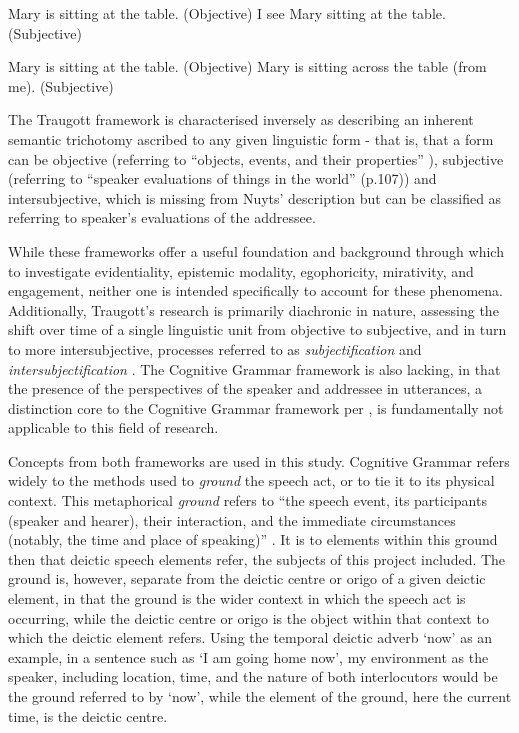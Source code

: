 \begin{exe}
\ex\label{ex:LangackerNuyts1}
\begin{xlist}
\ex Mary is sitting at the table. (Objective)\label{ex:LangackerNuyts1:Obj}
\ex I see Mary sitting at the table. (Subjective)\label{ex:LangackerNuyts1:Subj}
\end{xlist}
\cite[107]{Nuyts2015}
\end{exe}

\begin{exe}
\ex\label{ex:MyLangackerNuyts}
\begin{xlist}
\ex Mary is sitting at the table. (Objective)
\ex Mary is sitting across the table (from me). (Subjective)
\end{xlist}
\end{exe}

The Traugott framework is characterised inversely as describing an inherent semantic trichotomy ascribed to any given linguistic form - that is, that a form can be objective (referring to ``objects, events, and their properties'' \cite[107]{Nuyts2015}), subjective (referring to ``speaker evaluations of things in the world'' (p.107)) and intersubjective, which is missing from Nuyts' description but can be classified as referring to speaker's evaluations of the addressee.

While these frameworks offer a useful foundation and background through which to investigate evidentiality, epistemic modality, egophoricity, mirativity, and engagement, neither one is intended specifically to account for these phenomena. Additionally, Traugott's research is primarily diachronic in nature, assessing the shift over time of a single linguistic unit from objective to subjective, and in turn to more intersubjective, processes referred to as \textit{subjectification} and \textit{intersubjectification} \cites{Traugott1995}{Traugott2014}. The Cognitive Grammar framework is also lacking, in that the presence of the perspectives of the speaker and addressee in utterances, a distinction core to the Cognitive Grammar framework per , is fundamentally not applicable to this field of research.

Concepts from both frameworks are used in this study. Cognitive Grammar refers widely to the methods used to \textit{ground} the speech act, or to tie it to its physical context. This metaphorical \textit{ground} refers to ``the speech event, its participants (speaker and hearer), their interaction, and the immediate circumstances (notably, the time and place of speaking)'' \cite[259]{Langacker2008}. It is to elements within this ground then that deictic speech elements refer, the subjects of this project included. The ground is, however, separate from the deictic centre or origo of a given deictic element, in that the ground is the wider context in which the speech act is occurring, while the deictic centre or origo is the object within that context to which the deictic element refers. Using the temporal deictic adverb `now' as an example, in a sentence such as `I am going home now', my environment as the speaker, including location, time, and the nature of both interlocutors would be the ground referred to by `now', while the element of the ground, here the current time, is the deictic centre.

